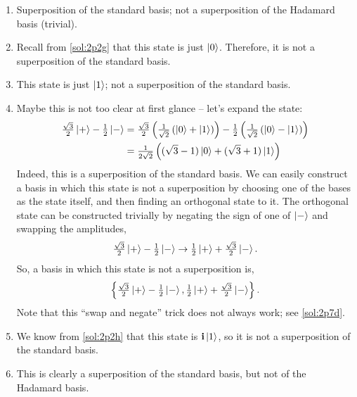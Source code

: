 {\Sol}
\begin{enumerate}[label=\alph*.,ref={Sol.~\thesection\alph*}]
\label{sol:2p3}
    \item Superposition of the standard basis; not a superposition of the Hadamard basis (trivial).
    \item Recall from \ref{sol:2p2g} that this state is just $\ket{0}$.
    Therefore, it is not a superposition of the standard basis.
    \item This state is just $\ket{1}$; not a superposition of the standard basis.
    \item \label{sol:2p2d} Maybe this is not too clear at first glance -- let's expand the state:
    \begin{align*}
        \tfrac{\sqrt{3}}{2} \ket{+} - \tfrac{1}{2} \ket{-} &= \tfrac{\sqrt{3}}{2} \left (\tfrac{1}{\sqrt{2}} \left ( \ket{0} + \ket{1} \right ) \right )  - \tfrac{1}{2} \left (\tfrac{1}{\sqrt{2}} \left ( \ket{0} - \ket{1} \right ) \right ) \\
        &= \tfrac{1}{2\sqrt{2}} \left ( ({\sqrt{3} - 1}) \ket{0} + ({\sqrt{3} + 1}) \ket{1} \right )
    \end{align*}
    Indeed, this is a superposition of the standard basis. We can easily construct a basis in which this state is
    not a superposition by choosing one of the bases as the state itself, and then finding an orthogonal state to it.
    The orthogonal state can be constructed trivially by negating the sign of one of $\ket{-}$ and swapping the amplitudes,
    \begin{align*}
        \tfrac{\sqrt{3}}{2} \ket{+} - \tfrac{1}{2} \ket{-} \to \tfrac{1}{2} \ket{+} + \tfrac{\sqrt{3}}{2} \ket{-}.
    \end{align*}
    So, a basis in which this state is not a superposition is,
    \begin{align*}
        \left \{ \tfrac{\sqrt{3}}{2} \ket{+} - \tfrac{1}{2} \ket{-}, \tfrac{1}{2} \ket{+} + \tfrac{\sqrt{3}}{2} \ket{-} \right \}.
    \end{align*}
    Note that this ``swap and negate'' trick does not always work; see \ref{sol:2p7d}.
    \item We know from \ref{sol:2p2h} that this state is $\mathbf{i} \ket{1}$, so it is not a superposition of the standard basis.
    \item This is clearly a superposition of the standard basis, but not of the Hadamard basis.
\end{enumerate}
